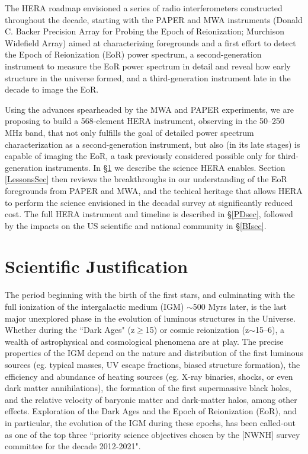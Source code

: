 \documentclass[preprint]{aastex}
\begin{document}
The HERA roadmap envisioned a series of radio interferometers constructed throughout the decade, starting with the PAPER and MWA instruments (Donald C. Backer Precision Array for Probing the Epoch of Reionization; Murchison Widefield Array) aimed at characterizing foregrounds and a first effort to detect the Epoch of Reionization (EoR) power spectrum, a second-generation instrument to measure the EoR power spectrum in detail and reveal how early structure in the universe formed, and a third-generation instrument late in the decade to image the EoR. 

Using the advances spearheaded by the MWA and PAPER experiments, we are proposing to build a 568-element HERA instrument, observing in the 50--250 MHz band, that not only fulfills the goal of detailed power spectrum characterization as a second-generation instrument, but also (in its late stages) is capable of imaging the EoR, a task previously considered possible only for third-generation instruments.
In \S \ref{SJsec} we describe the science HERA enables. Section \ref{LessonsSec} then reviews the breakthroughs in our understanding of the EoR foregrounds from PAPER and MWA, and the techical heritage that allows HERA to perform the science envisioned in the decadal survey at significantly reduced cost. The full HERA instrument and timeline is described in \S \ref{PDsec}, followed by the impacts on the US scientific and national community in \S \ref{BIsec}.

\vspace{-0.25in}
\section{Scientific Justification}
\label{SJsec}

The period beginning with the birth of the first stars, and culminating with
the full ionization of the intergalactic medium (IGM) $\sim$500 Myrs later, is
the last major unexplored phase in the evolution of luminous structures in the
Universe.  Whether during the ``Dark Ages" (z$\ge$15) or cosmic reionization
(z$\sim$15--6), a wealth of astrophysical and cosmological phenomena are at
play.  The precise properties of the IGM depend on the nature and distribution
of the first luminous sources (eg. typical masses, UV escape fractions, biased
structure formation), the efficiency and abundance of heating sources (eg.
X-ray binaries, shocks, or even dark matter annihilations), the formation of
the first supermassive black holes, and the relative velocity of baryonic
matter and dark-matter halos, among other effects.  Exploration of the Dark
Ages and the Epoch of Reionization (EoR), and in particular, the evolution of
the IGM during these epochs, has been called-out as one of the top three
``priority science objectives chosen by the [NWNH] survey committee for the
decade 2012-2021".
\end{document}
